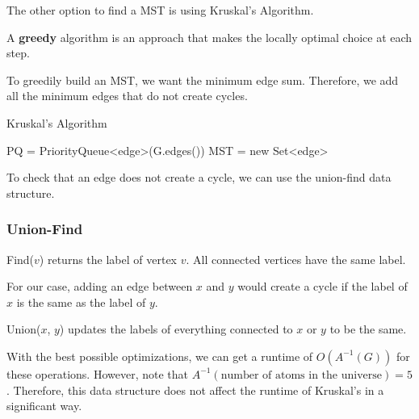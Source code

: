 The other option to find a MST is using Kruskal's Algorithm.

\begin{definition}
	A \textbf{greedy} algorithm is an approach that makes the locally optimal choice at each step. 
\end{definition}

To greedily build an MST, we want the minimum edge sum. Therefore, we add all the minimum edges that do not create cycles.

\begin{algorithm}[H]
	\caption{Kruskal's Algorithm}
	PQ = PriorityQueue<edge>(G.edges())\;
	MST = new Set<edge>\;
\end{algorithm}

To check that an edge does not create a cycle, we can use the union-find data structure. 

\subsubsection{Union-Find}

Find(\( v \)) returns the label of vertex \( v \). All connected vertices have the same label.

\begin{note}
	For our case, adding an edge between \( x \) and \( y \) would create a cycle if the label of \( x \) is the same as the label of \( y \). 
\end{note}

Union(\( x \), \( y \)) updates the labels of everything connected to \( x \) or \( y \) to be the same.

With the best possible optimizations, we can get a runtime of \( O(A^{-1}(G) ) \) for these operations. However, note that \( A^{-1}(\text{number of atoms in the universe})=5  \). Therefore, this data structure does not affect the runtime of Kruskal's in a significant way.
